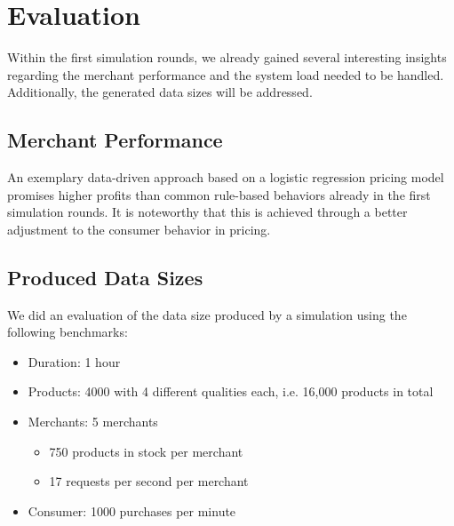 %
\section{Evaluation}
\label{sec:evaluation}
%
Within the first simulation rounds, we already gained several interesting insights regarding the merchant performance and the system load needed to be handled. Additionally, the generated data sizes will be addressed.

\subsection{Merchant Performance}
\label{sec:merchant_evaluation}
%
An exemplary data-driven approach based on a logistic regression pricing model promises higher profits than common rule-based behaviors already in the first simulation rounds. It is noteworthy that this is achieved through a better adjustment to the consumer behavior in pricing.





%
\subsection{Produced Data Sizes}
%

We did an evaluation of the data size produced by a simulation using the following benchmarks:
\begin{itemize}
    \item Duration: 1 hour
    \item Products: 4000 with 4 different qualities each, i.e. 16,000 products in total
    \item Merchants: 5 merchants
    \begin{itemize}[nosep]
        \item 750 products in stock per merchant
        \item 17 requests per second per merchant
    \end{itemize}
    \item Consumer: 1000 purchases per minute
\end{itemize}

